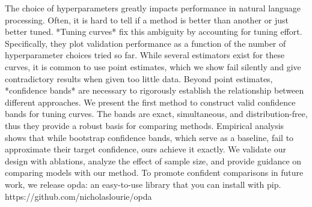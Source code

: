 The choice of hyperparameters greatly impacts performance in natural language processing. Often, it is hard to tell if a method is better than another or just better tuned. *Tuning curves* fix this ambiguity by accounting for tuning effort. Specifically, they plot validation performance as a function of the number of hyperparameter choices tried so far. While several estimators exist for these curves, it is common to use point estimates, which we show fail silently and give contradictory results when given too little data. Beyond point estimates, *confidence bands* are necessary to rigorously establish the relationship between different approaches. We present the first method to construct valid confidence bands for tuning curves. The bands are exact, simultaneous, and distribution-free, thus they provide a robust basis for comparing methods. Empirical analysis shows that while bootstrap confidence bands, which serve as a baseline, fail to approximate their target confidence, ours achieve it exactly. We validate our design with ablations, analyze the effect of sample size, and provide guidance on comparing models with our method. To promote confident comparisons in future work, we release opda: an easy-to-use library that you can install with pip. https://github.com/nicholaslourie/opda